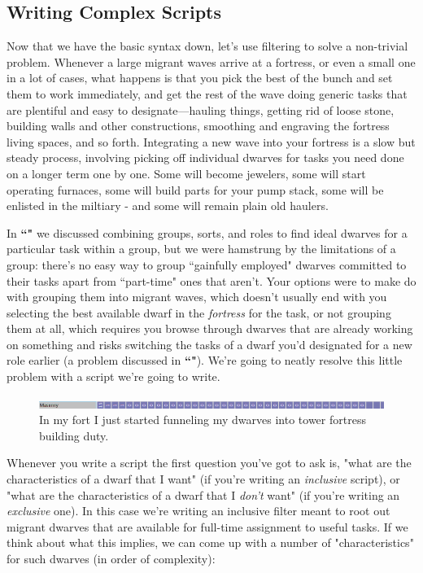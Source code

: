 \documentclass[]{article}
\begin{document}
\subsection{Writing Complex Scripts}
\label{sec:Writing Complex Scripts}
Now that we have the basic syntax down, let's use filtering to solve a non-trivial problem. Whenever a
large migrant waves arrive at a fortress, or even a small one in a lot of cases, what happens is that you
pick the best of the bunch and set them to work immediately, and get the rest of the wave doing generic
tasks that are plentiful and easy to designate---hauling things, getting rid of loose stone, building
walls and other constructions, smoothing and engraving the fortress living spaces, and so forth.
Integrating a new wave into your fortress is a slow but steady process, involving picking off individual
dwarves for tasks you need done on a longer term one by one. Some will become jewelers, some will start
operating furnaces, some will build parts for your pump stack, some will be enlisted in the miltiary -
and some will remain plain old haulers.

In  \textbf{``"} we discussed combining groups, sorts, and roles to find ideal
dwarves for a particular task within a group, but we were hamstrung by the limitations of a group:
there's no easy way to group ``gainfully employed" dwarves committed to their tasks apart from
``part-time" ones that aren't. Your options were to make do with grouping them into migrant waves, which
doesn't usually end with you selecting the best available dwarf in the \emph{fortress} for the task, or
not grouping them at all, which requires you browse through dwarves that are already working on something
and risks switching the tasks of a dwarf you'd designated for a new role earlier (a problem discussed in
\textbf{``"}). We're going to neatly resolve this little problem with a
script we're going to write.

\begin{figure}[h!]
\centering
\includegraphics[scale=.73]{Sec4Fig2}
\caption{In my fort I just started funneling my dwarves into tower fortress building duty.}
\end{figure}

Whenever you write a script the first question you've got to ask is, "what are the characteristics of a
dwarf that I want" (if you're writing an \emph{inclusive} script), or "what are the characteristics of a
dwarf that I \emph{don't} want" (if you're writing an \emph{exclusive} one). In this case we're writing
an inclusive filter meant to root out migrant dwarves that are available for full-time assignment to
useful tasks. If we think about what this implies, we can come up with a number of "characteristics" for
such dwarves (in order of complexity):
\end{document}
